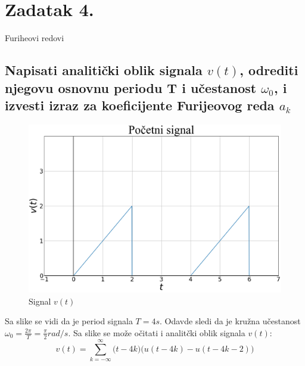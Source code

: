 \documentclass[titlepage,a4paper,12pt]{article}
\begin{document}
	\section{Zadatak 4.}
	\Large{Furiheovi redovi}
	\normalsize{}
	
	\subsection[Prvi deo]{Napisati analitički oblik signala $v(t)$, odrediti njegovu osnovnu periodu T i učestanost $\omega_0$, i izvesti izraz za koeficijente Furijeovog reda $a_k$}
	\begin{figure}[ht]
		\centering
		\includegraphics[width=\textwidth]{Images/zadatak4pic1.png}
		\caption{Signal $v(t)$}\label{fig:slika8}
	\end{figure}
	\noindent Sa slike se vidi da je period signala $T = 4s$. Odavde sledi da je kružna učestanost $\omega_0 = \frac{2\pi}{T} = \frac{\pi}{2} rad/s$. Sa slike se može očitati i analitčki oblik signala $v(t)$:
	\begin{equation}
		v(t) = \sum_{k=-\infty}^{\infty}\big(t-4k\big)\big( u(t-4k) - u(t - 4k-2)\big)
	\end{equation}
	\clearpage
	
	\clearpage
	
\end{document}
